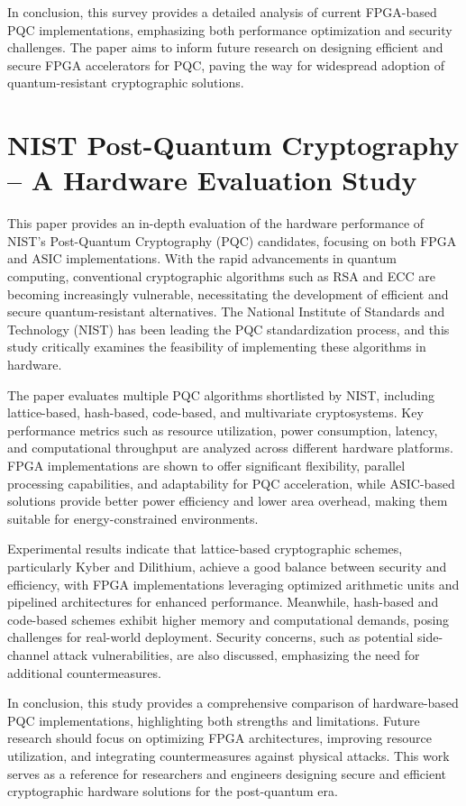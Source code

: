 \documentclass[a4paper, 12pt]{report}
\begin{document}
	In conclusion, this survey provides a detailed analysis of current FPGA-based PQC implementations, emphasizing both performance optimization and security challenges. The paper aims to inform future research on designing efficient and secure FPGA accelerators for PQC, paving the way for widespread adoption of quantum-resistant cryptographic solutions.

	
	\section{NIST Post-Quantum Cryptography – A Hardware Evaluation Study \cite{paper_2}}
	This paper provides an in-depth evaluation of the hardware performance of NIST’s Post-Quantum Cryptography (PQC) candidates, focusing on both FPGA and ASIC implementations. With the rapid advancements in quantum computing, conventional cryptographic algorithms such as RSA and ECC are becoming increasingly vulnerable, necessitating the development of efficient and secure quantum-resistant alternatives. The National Institute of Standards and Technology (NIST) has been leading the PQC standardization process, and this study critically examines the feasibility of implementing these algorithms in hardware.
	
	The paper evaluates multiple PQC algorithms shortlisted by NIST, including lattice-based, hash-based, code-based, and multivariate cryptosystems. Key performance metrics such as resource utilization, power consumption, latency, and computational throughput are analyzed across different hardware platforms. FPGA implementations are shown to offer significant flexibility, parallel processing capabilities, and adaptability for PQC acceleration, while ASIC-based solutions provide better power efficiency and lower area overhead, making them suitable for energy-constrained environments.

	  Experimental results indicate that lattice-based cryptographic schemes, particularly Kyber and Dilithium, achieve a good balance between security and efficiency, with FPGA implementations leveraging optimized arithmetic units and pipelined architectures for enhanced performance. Meanwhile, hash-based and code-based schemes exhibit higher memory and computational demands, posing challenges for real-world deployment. Security concerns, such as potential side-channel attack vulnerabilities, are also discussed, emphasizing the need for additional countermeasures.
	
	In conclusion, this study provides a comprehensive comparison of hardware-based PQC implementations, highlighting both strengths and limitations. Future research should focus on optimizing FPGA architectures, improving resource utilization, and integrating countermeasures against physical attacks. This work serves as a reference for researchers and engineers designing secure and efficient cryptographic hardware solutions for the post-quantum era.
	\newpage
	
	
\end{document}
